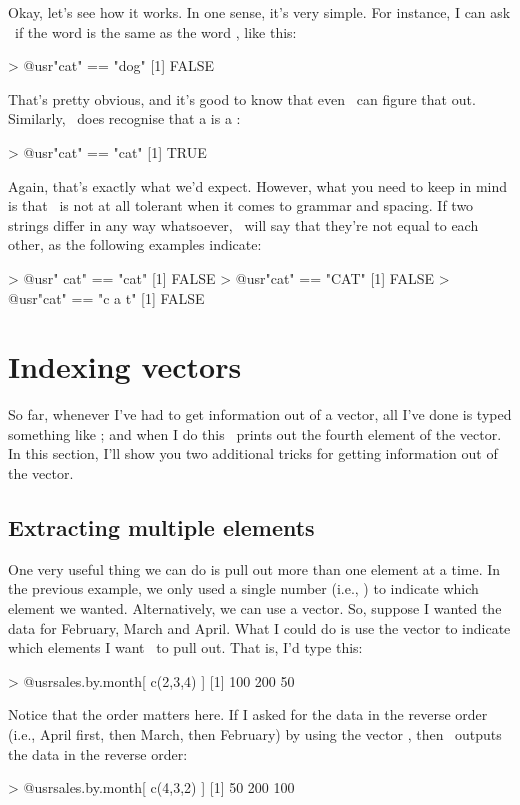 Okay, let's see how it works. In one sense, it's very simple. For instance, I can ask \R\ if the word  is the same as the word , like this:
\begin{rblock1}
> @usr{"cat" == "dog"}
[1] FALSE
\end{rblock1}
That's pretty obvious, and it's good to know that even \R\ can figure that out. Similarly, \R\ does recognise that a  is a :
\begin{rblock1}
> @usr{"cat" == "cat"}
[1] TRUE
\end{rblock1}
Again, that's exactly what we'd expect. However, what you need to keep in mind is that \R\ is not at all tolerant when it comes to grammar and spacing. If two strings differ in any way whatsoever, \R\ will say that they're not equal to each other, as the following examples indicate:
\begin{rblock1}
> @usr{" cat" == "cat"}
[1] FALSE
> @usr{"cat" == "CAT"}
[1] FALSE
> @usr{"cat" == "c a t"}
[1] FALSE
\end{rblock1}



\section{Indexing vectors~\label{sec:indexing}} 

So far, whenever I've had to get information out of a vector, all I've done is typed something like ; and when I do this \R\ prints out the fourth element of the  vector. In this section, I'll show you two additional tricks for getting information out of the vector.

\subsection{Extracting multiple elements}

One very useful thing we can do is pull out more than one element at a time. In the previous example, we only used a single number (i.e., ) to indicate which element we wanted. Alternatively, we can use a vector. So, suppose I wanted the data for February, March and April. What I could do is use the vector  to indicate which elements I want \R\ to pull out. That is, I'd type this:
\begin{rblock1}
> @usr{sales.by.month[ c(2,3,4) ]}
[1] 100 200  50
\end{rblock1}
Notice that the order matters here. If I asked for the data in the reverse order (i.e., April first, then March, then February) by using the vector , then \R\ outputs the data in the reverse order:
\begin{rblock1}
 > @usr{sales.by.month[ c(4,3,2) ]}
[1]  50 200 100
\end{rblock1}

